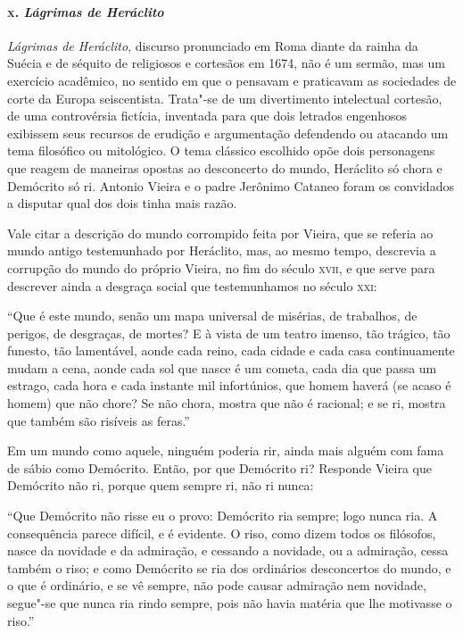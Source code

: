 \paragraph{\textsc{x}. \emph{Lágrimas de Heráclito}}

\emph{Lágrimas de Heráclito}, discurso pronunciado em Roma diante da
rainha da Suécia e de séquito de religiosos e cortesãos em 1674, não é
um sermão, mas um exercício acadêmico, no sentido em que o pensavam e
praticavam as sociedades de corte da Europa seiscentista. Trata"-se de um
divertimento intelectual cortesão, de uma controvérsia fictícia,
inventada para que dois letrados engenhosos exibissem seus recursos de
erudição e argumentação defendendo ou atacando um tema filosófico ou
mitológico. O tema clássico escolhido opõe dois personagens que reagem
de maneiras opostas ao desconcerto do mundo, Heráclito só chora e
Demócrito só ri. Antonio Vieira e o padre Jerônimo Cataneo foram os
convidados a disputar qual dos dois tinha mais razão.

Vale citar a descrição do mundo corrompido feita por Vieira, que se
referia ao mundo antigo testemunhado por Heráclito, mas, ao mesmo tempo,
descrevia a corrupção do mundo do próprio Vieira, no fim do século \textsc{xvii},
e que serve para descrever ainda a desgraça social que testemunhamos no
século \textsc{xxi}:

``Que é este mundo, senão um mapa universal de misérias, de trabalhos,
de perigos, de desgraças, de mortes? E à vista de um teatro imenso, tão
trágico, tão funesto, tão lamentável, aonde cada reino, cada cidade e
cada casa continuamente mudam a cena, aonde cada sol que nasce é um
cometa, cada dia que passa um estrago, cada hora e cada instante mil
infortúnios, que homem haverá (se acaso é homem) que não chore? Se não
chora, mostra que não é racional; e se ri, mostra que também são
risíveis as feras.''

Em um mundo como aquele, ninguém poderia rir, ainda mais alguém com fama
de sábio como Demócrito. Então, por que Demócrito ri? Responde Vieira
que Demócrito não ri, porque quem sempre ri, não ri nunca:

``Que Demócrito não risse eu o provo: Demócrito ria sempre; logo nunca
ria. A consequência parece difícil, e é evidente. O riso, como dizem
todos os filósofos, nasce da novidade e da admiração, e cessando a
novidade, ou a admiração, cessa também o riso; e como Demócrito se ria
dos ordinários desconcertos do mundo, e o que é ordinário, e se vê
sempre, não pode causar admiração nem novidade, segue"-se que nunca ria
rindo sempre, pois não havia matéria que lhe motivasse o riso.''
